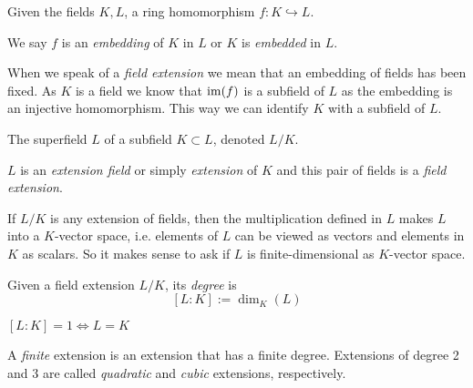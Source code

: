 \begin{definition}
   Given the fields \(K, L\), a ring homomorphism \(f: K \hookrightarrow L\).
\end{definition}
\begin{remark}[Terminology]
   We say \(f\) is an \emph{embedding} of \(K\) in \(L\) or \(K\) is \emph{embedded} in \(L\).
\end{remark}

When we speak of a \emph{field extension} we mean that an embedding of fields has been fixed.
As \(K\) is a field we know that \(\operatorname{im}(f)\) is a subfield of \(L\) as the embedding is an injective homomorphism.
This way we can identify \(K\) with a subfield of \(L\).

\begin{definition}
   The superfield \(L\) of a subfield \(K \subset L\), denoted \(L/K\).
\end{definition}
\begin{remark}[Terminology]
   \(L\) is an \emph{extension field} or simply \emph{extension} of \(K\) and this pair of fields is a \emph{field extension}.
\end{remark}

If \(L/K\) is any extension of fields, then the multiplication defined in \(L\) makes \(L\) into a \(K\)-vector space, i.e. elements of \(L\) can be viewed as vectors and elements in \(K\) as scalars.
So it makes sense to ask if \(L\) is finite-dimensional as \(K\)-vector space.

\begin{definition}
   Given a field extension \(L/K\), its \emph{degree} is
   \[[L:K] := \dim_K(L)\]
\end{definition}
\begin{remark}
   \([L:K] = 1 \iff L = K\)
\end{remark}
\begin{remark}[Terminology]
   A \emph{finite} extension is an extension that has a finite degree.
   Extensions of degree 2 and 3 are called \emph{quadratic} and \emph{cubic} extensions, respectively.
\end{remark}

